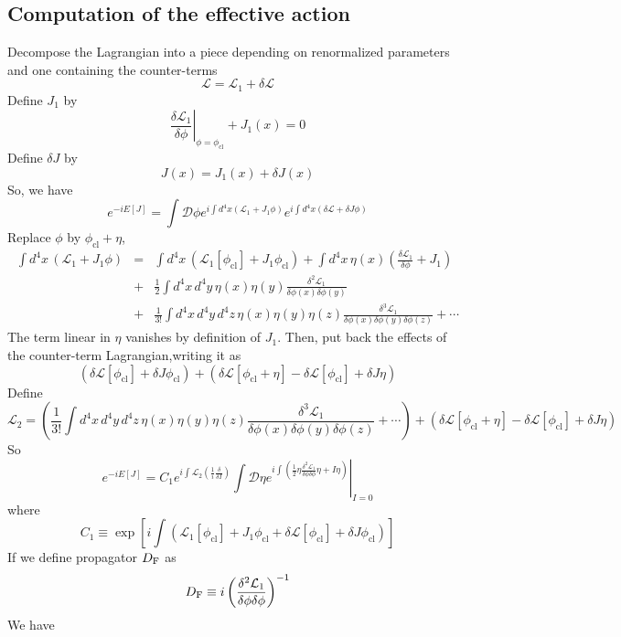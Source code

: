 \subsection{Computation of the effective action}
Decompose the Lagrangian into a piece depending on renormalized parameters and one containing the counter-terms
\[\mathcal{L} = \mathcal{L}_1 + \delta \mathcal{L}\]
Define $J_1$ by
\[\left. \frac{\delta \mathcal{L}_1}{\delta \phi} \right|_{\phi = \phi_{\mathrm{cl}}} + J_1(x) = 0\]
Define $\delta J$ by
\[J(x) = J_1(x) + \delta J(x)\]
So, we have
\[e^{-iE[J]} = \int \mathcal{D}\phi e^{i\int d^4x (\mathcal{L}_1 + J_1\phi)} e^{i\int d^4x (\delta \mathcal{L} + \delta J \phi)}\]
Replace $\phi$ by $\phi_{\mathrm{cl}}+\eta$,
\begin{eqnarray}
\int d^4x \, (\mathcal{L}_1 + J_1\phi) &=& \int d^4x \, (\mathcal{L}_1[\phi_{\mathrm{cl}}] + J_1\phi_{\mathrm{cl}}) + \int d^4x \, \eta(x) \left( \frac{\delta \mathcal{L}_1}{\delta \phi} + J_1 \right) \nonumber \\
&+& \frac{1}{2} \int d^4x \, d^4y \, \eta(x) \eta(y) \frac{\delta^2 \mathcal{L}_1}{\delta \phi(x) \delta \phi(y)} \nonumber \\
&+& \frac{1}{3!} \int d^4x \, d^4y \, d^4z \, \eta(x) \eta(y) \eta(z) \frac{\delta^3 \mathcal{L}_1}{\delta \phi(x) \delta \phi(y) \delta \phi(z)} + \cdots \nonumber
\end{eqnarray}
The term linear in $\eta$ vanishes by definition of $J_1$. 
Then, put back the effects of the counter-term Lagrangian,writing it as
\[(\delta \mathcal{L}[\phi_{\mathrm{cl}}] + \delta J \phi_{\mathrm{cl}} ) + ( \delta \mathcal{L}[\phi_{\mathrm{cl}} + \eta] - \delta\mathcal{L} [\phi_{\mathrm{cl}}] + \delta J \eta)\]
Define
\[\mathcal{L}_2 = \left(\frac{1}{3!} \int d^4x \, d^4y \, d^4z \, \eta(x) \eta(y) \eta(z) \frac{\delta^3 \mathcal{L}_1}{\delta \phi(x) \delta \phi(y) \delta \phi(z)} + \cdots \right) + ( \delta \mathcal{L}[\phi_{\mathrm{cl}} + \eta] - \delta\mathcal{L} [\phi_{\mathrm{cl}}] + \delta J \eta)\]
So
\[e^{-iE[J]} = C_1 e^{i\int \mathcal{L}_2(\frac{1}{i} \frac{\delta}{\delta I})} \left. \int \mathcal{D}\eta e^{i\int \left(\frac{1}{2} \eta \frac{\delta^2 \mathcal{L}_1}{\delta \phi \delta \phi} \eta + I\eta \right)} \right|_{I=0}\]
where
\[C_1 \equiv \exp \left[ i \int ( \mathcal{L}_1 [\phi_{\mathrm{cl}}] + J_1\phi_{\mathrm{cl}} + \delta \mathcal{L}[\phi_{\mathrm{cl}}] + \delta J \phi_{\mathrm{cl}} )\right]\]
If we define propagator $D_{\rm F}$ as
\[D_{\rm F} \equiv i \left( \frac{\delta^2 \mathcal{L}_1}{\delta \phi \delta \phi}\right)^{-1}\]
We have
